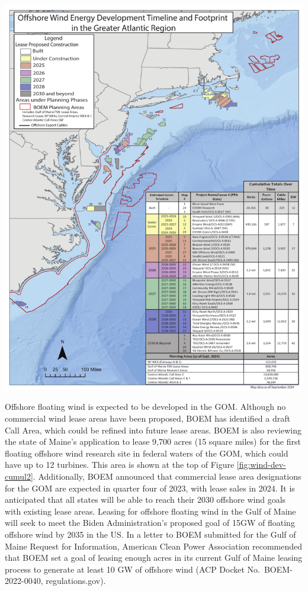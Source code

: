 \documentclass[
  10pt,
]{article}
\let\origfigure\figure
\let\endorigfigure\endfigure
\renewenvironment{figure}[1][2] {
    \expandafter\origfigure\expandafter[H]
} {
    \endorigfigure
}
\begin{document}
\begin{figure}

{\centering \includegraphics[width=0.9\linewidth]{SOE-NEFMC_files/figure-latex/wind-dev-cumul2-1} 

}

\caption{All Northeast Project areas by year construction ends (each project has 2 year construction period).}\label{fig:wind-dev-cumul2}
\end{figure}

Offshore floating wind is expected to be developed in the GOM. Although no commercial wind lease areas have been proposed, BOEM has identified a draft Call Area, which could be refined into future lease areas. BOEM is also reviewing the state of Maine's application to lease 9,700 acres (15 square miles) for the first floating offshore wind research site in federal waters of the GOM, which could have up to 12 turbines. This area is shown at the top of Figure \ref{fig:wind-dev-cumul2}. Additionally, BOEM announced that commercial lease area designations for the GOM are expected in quarter four of 2023, with lease sales in 2024. It is anticipated that all states will be able to reach their 2030 offshore wind goals with existing lease areas. Leasing for offshore floating wind in the Gulf of Maine will seek to meet the Biden Administration's proposed goal of 15GW of floating offshore wind by 2035 in the US. In a letter to BOEM submitted for the Gulf of Maine Request for Information, American Clean Power Association recommended that BOEM set a goal of leasing enough acres in its current Gulf of Maine leasing process to generate at least 10 GW of offshore wind (ACP Docket No.~BOEM-2022-0040, regulations.gov).
\end{document}
